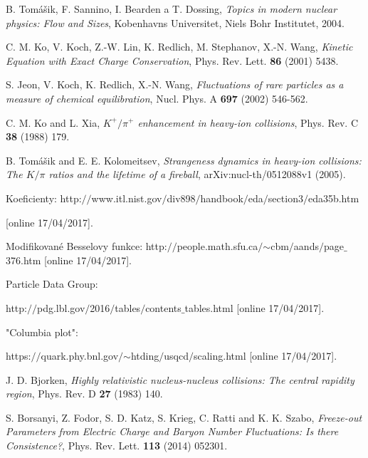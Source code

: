 \documentclass[12pt,titlepage,twoside]{article}
\numberwithin{equation}{section}
\numberwithin{figure}{section}
\numberwithin{table}{section}
\begin{document}
\begin{thebibliography}{99}
    B. Tomášik, F. Sannino, I. Bearden a T. Dossing, \textit{Topics in modern nuclear physics: Flow and Sizes}, Kobenhavns Universitet, Niels Bohr Institutet, 2004.
    
    C. M. Ko, V. Koch, Z.-W. Lin, K. Redlich, M. Stephanov, X.-N. Wang, \textit{Kinetic Equation with Exact Charge Conservation}, Phys. Rev. Lett. {\bf 86} (2001) 5438. 
    
    S. Jeon, V. Koch, K. Redlich, X.-N. Wang, \textit{Fluctuations of rare particles as a measure of chemical equilibration}, Nucl. Phys. A {\bf 697} (2002) 546-562.
    
     C. M. Ko and L. Xia, \textit{$K^{+} / \pi ^{+}$ enhancement in heavy-ion collisions}, Phys. Rev. C {\bf 38} (1988) 179. 
     
     B. Tomášik and E. E. Kolomeitsev, \textit{Strangeness dynamics in heavy-ion collisions: The $K / \pi$ ratios and the lifetime of a fireball}, arXiv:nucl-th/0512088v1 (2005). 
    
    Koeficienty: http:$//$www.itl.nist.gov$/$div898$/$handbook$/$eda$/$section3$/$eda35b.htm 
    
    [online 17/04/2017].
    
    Modifikované Besselovy funkce: http:$//$people.math.sfu.ca$/$$\sim$cbm$/$aands$/$page$\_$376.htm
    [online 17/04/2017].
    
    Particle Data Group:
    
     http:$//$pdg.lbl.gov$/$2016$/$tables$/$contents$\_$tables.html
    [online 17/04/2017].
    
    "Columbia plot": 
    
    https:$//$quark.phy.bnl.gov$/$$\sim$htding$/$usqcd$/$scaling.html
    [online 17/04/2017].
    	
    J. D. Bjorken, \textit{Highly relativistic nucleus-nucleus collisions: The central rapidity region}, Phys. Rev. D {\bf 27} (1983) 140.
    
    	
    S. Borsanyi, Z. Fodor, S. D. Katz, S. Krieg, C. Ratti and K. K. Szabo, \textit{Freeze-out Parameters from Electric Charge and Baryon Number Fluctuations: Is there Consistence?}, Phys. Rev. Lett. {\bf 113} (2014) 052301.
    	
\end{thebibliography}
\end{document}
